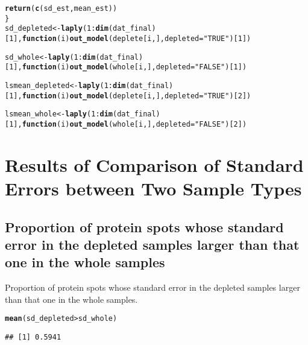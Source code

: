 \documentclass{article}\usepackage[]{graphicx}\usepackage[]{color}
\makeatletter
\newcommand{\hlnum}[1]{\textcolor[rgb]{0.686,0.059,0.569}{#1}}%
\newcommand{\hlstr}[1]{\textcolor[rgb]{0.192,0.494,0.8}{#1}}%
\newcommand{\hlopt}[1]{\textcolor[rgb]{0,0,0}{#1}}%
\newcommand{\hlstd}[1]{\textcolor[rgb]{0.345,0.345,0.345}{#1}}%
\newcommand{\hlkwa}[1]{\textcolor[rgb]{0.161,0.373,0.58}{\textbf{#1}}}%
\newcommand{\hlkwb}[1]{\textcolor[rgb]{0.69,0.353,0.396}{#1}}%
\newcommand{\hlkwc}[1]{\textcolor[rgb]{0.333,0.667,0.333}{#1}}%
\newcommand{\hlkwd}[1]{\textcolor[rgb]{0.737,0.353,0.396}{\textbf{#1}}}%
\newenvironment{kframe}{%
 \def\at@end@of@kframe{}%
 \ifinner\ifhmode%
  \def\at@end@of@kframe{\end{minipage}}%
  \begin{minipage}{\columnwidth}%
 \fi\fi%
 \def\FrameCommand##1{\hskip\@totalleftmargin \hskip-\fboxsep
 \colorbox{shadecolor}{##1}\hskip-\fboxsep
     \hskip-\linewidth \hskip-\@totalleftmargin \hskip\columnwidth}%
 \MakeFramed {\advance\hsize-\width
   \@totalleftmargin\z@ \linewidth\hsize
   \@setminipage}}%
 {\par\unskip\endMakeFramed%
 \at@end@of@kframe}
\newenvironment{knitrout}{}{} %
\makeatother
\begin{document}
\begin{knitrout}
\begin{kframe}
\begin{alltt}
  \hlkwd{return}\hlstd{(}\hlkwd{c}\hlstd{(sd_est, mean_est))}
\hlstd{\}}
\hlstd{sd_depleted} \hlkwb{<-} \hlkwd{laply}\hlstd{(}\hlnum{1}\hlopt{:}\hlkwd{dim}\hlstd{(dat_final)[}\hlnum{1}\hlstd{],} \hlkwa{function}\hlstd{(}\hlkwc{i}\hlstd{)}\hlkwd{out_model}\hlstd{(deplete[i,],} \hlkwc{depleted} \hlstd{=} \hlstr{"TRUE"}\hlstd{)[}\hlnum{1}\hlstd{])}

\hlstd{sd_whole} \hlkwb{<-} \hlkwd{laply}\hlstd{(}\hlnum{1}\hlopt{:}\hlkwd{dim}\hlstd{(dat_final)[}\hlnum{1}\hlstd{],} \hlkwa{function}\hlstd{(}\hlkwc{i}\hlstd{)}\hlkwd{out_model}\hlstd{(whole[i,],} \hlkwc{depleted} \hlstd{=} \hlstr{"FALSE"}\hlstd{)[}\hlnum{1}\hlstd{])}

\hlstd{lsmean_depleted} \hlkwb{<-} \hlkwd{laply}\hlstd{(}\hlnum{1}\hlopt{:}\hlkwd{dim}\hlstd{(dat_final)[}\hlnum{1}\hlstd{],} \hlkwa{function}\hlstd{(}\hlkwc{i}\hlstd{)}\hlkwd{out_model}\hlstd{(deplete[i,],} \hlkwc{depleted} \hlstd{=} \hlstr{"TRUE"}\hlstd{)[}\hlnum{2}\hlstd{])}

\hlstd{lsmean_whole} \hlkwb{<-} \hlkwd{laply}\hlstd{(}\hlnum{1}\hlopt{:}\hlkwd{dim}\hlstd{(dat_final)[}\hlnum{1}\hlstd{],} \hlkwa{function}\hlstd{(}\hlkwc{i}\hlstd{)}\hlkwd{out_model}\hlstd{(whole[i,],} \hlkwc{depleted} \hlstd{=} \hlstr{"FALSE"}\hlstd{)[}\hlnum{2}\hlstd{])}
\end{alltt}
\end{kframe}
\end{knitrout}

\section{Results of Comparison of Standard Errors between Two Sample Types}
\subsection{Proportion of protein spots whose standard error in the depleted samples larger than that one  in the whole samples}
Proportion of protein spots whose standard error in the depleted samples larger than that one  in the whole samples.
\begin{knitrout}
\color{fgcolor}\begin{kframe}
\begin{alltt}
\hlkwd{mean}\hlstd{(sd_depleted} \hlopt{>} \hlstd{sd_whole)}
\end{alltt}
\begin{verbatim}
## [1] 0.5941
\end{verbatim}
\end{kframe}
\end{knitrout}
\end{document}
